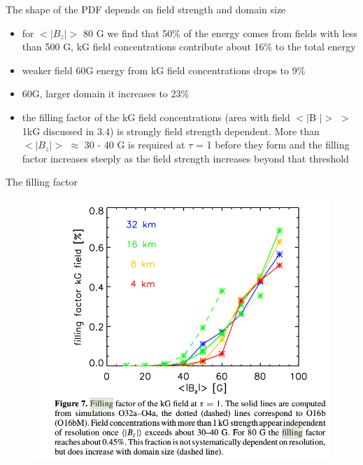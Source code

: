 \documentclass{beamer}
\begin{document}
\begin{frame}{The shape of the PDF depends on field strength and domain size }
\begin{itemize}
\item for $<\lvert B_z \rvert>$  80 G we find that 50\% of the energy
comes from fields with less than 500 G, kG field concentrations
contribute about 16\% to the total energy 
\item weaker field 60G  energy from kG field concentrations drops to 9\%
\item 60G, larger domain it increases to 23\%
\item the filling factor of the kG field
concentrations (area with field $<\lvert$B $\rvert>$ $>$ 1kG discussed in 3.4) is strongly field strength dependent. More than $<\lvert B_z \rvert>$ 	 $\approx$ 30 - 40 G is required at $\tau$ = 1 before they form and the
filling factor increases steeply as the field strength increases
beyond that threshold 
\end{itemize}

\end{frame}

\begin{frame}{The filling factor}
\begin{figure}[H]
 \centering
 \includegraphics[scale=0.3]{img44-3.png}
\end{figure}

\end{frame}
\end{document}
